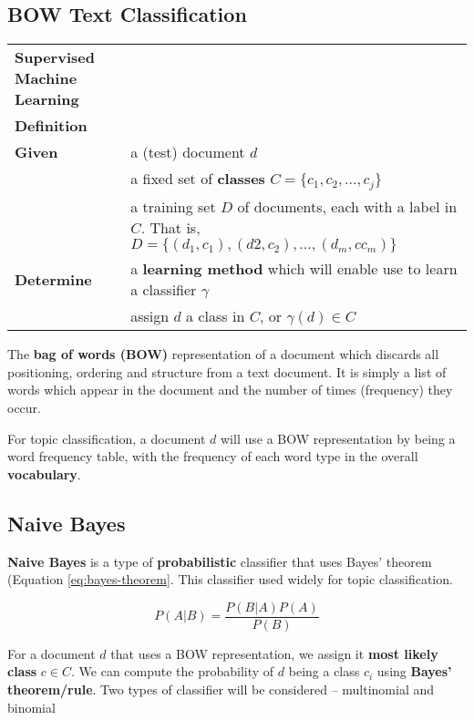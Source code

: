 \documentclass{article}
\begin{document}
\subsection{BOW Text Classification}
\label{sec:bow-text-classification}

\begin{tabular}{p{7cm}p{10cm}}
\textbf{Supervised Machine Learning} \\
\textbf{Definition} \\
\textbf{Given} & a (test) document $d$ \\
	& a fixed set of \textbf{classes} $C = \lbrace c_1, c_2, ..., c_j \rbrace$ \\
	& a training set $D$ of documents, each with a label in $C$. That is, $D = \lbrace (d_1, c_1), (d2, c_2), ..., (d_m,c c_m) \rbrace$ \\
\textbf{Determine} & a \textbf{learning method} which will enable use to learn a classifier $\gamma$ \\
	& assign $d$ a class in $C$, or $\gamma(d) \in C$
\end{tabular}

The \textbf{bag of words (BOW)} representation of a document which discards all positioning, ordering and structure from a text document. It is simply a list of words which appear in the document and the number of times (frequency) they occur.

For topic classification, a document $d$ will use a BOW representation by being a word frequency table, with the frequency of each word type in the overall \textbf{vocabulary}.

\subsection{Naive Bayes}

\textbf{Naive Bayes} is a type of \textbf{probabilistic} classifier that uses Bayes' theorem (Equation \ref{eq:bayes-theorem}. This classifier used widely for topic classification.

\begin{equation}
	P(A|B) = \frac{P(B|A) P(A)}{P(B)}
	\label{eq:bayes-theorem}
\end{equation}

For a document $d$ that uses a BOW representation, we assign it \textbf{most likely class} $c \in C$. We can compute the probability of $d$ being a class $c_i$ using \textbf{Bayes' theorem/rule}. Two types of classifier will be considered -- multinomial and binomial
\end{document}
